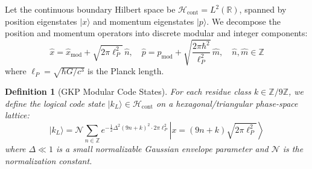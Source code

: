 \documentclass[11pt,a4paper]{article}
\newtheorem{definition}{Definition}
\begin{document}
Let the continuous boundary Hilbert space be $\mathcal{H}_{\text{cont}} = L^2(\mathbb{R})$, spanned by position eigenstates $|x\rangle$ and momentum eigenstates $|p\rangle$. We decompose the position and momentum operators into discrete modular and integer components:
\begin{equation}
\hat{x} = \hat{x}_{\text{mod}} + \sqrt{2\pi \ell_P^2} \, \hat{n}, \quad \hat{p} = \hat{p}_{\text{mod}} + \sqrt{\frac{2\pi \hbar^2}{\ell_P^2}} \, \hat{m}, \quad \hat{n}, \hat{m} \in \mathbb{Z}
\end{equation}
where $\ell_P = \sqrt{\hbar G / c^3}$ is the Planck length.

\begin{definition}[GKP Modular Code States]
For each residue class $k \in \mathbb{Z}/9\mathbb{Z}$, we define the logical code state $|k_L\rangle \in \mathcal{H}_{\text{cont}}$ on a hexagonal/triangular phase-space lattice:
\begin{equation}
|k_L\rangle = \mathcal{N} \sum_{n \in \mathbb{Z}} e^{-\frac{1}{2}\Delta^2 (9n + k)^2 \cdot 2\pi \ell_P^2} \left| x = (9n + k) \sqrt{2\pi \ell_P^2} \right\rangle
\end{equation}
where $\Delta \ll 1$ is a small normalizable Gaussian envelope parameter and $\mathcal{N}$ is the normalization constant.
\end{definition}
\end{document}
